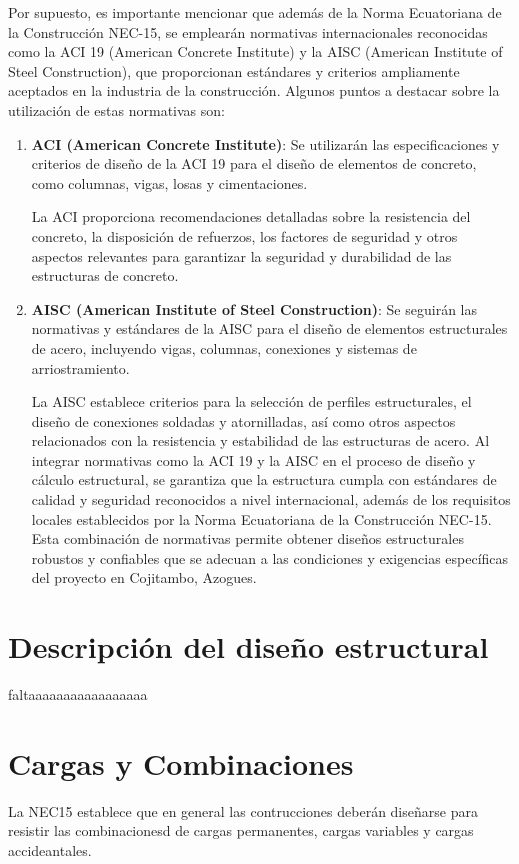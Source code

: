 \documentclass{article}
\begin{document}
Por supuesto, es importante mencionar que además de la Norma Ecuatoriana de la Construcción NEC-15, se emplearán normativas internacionales reconocidas como la ACI 19 (American Concrete Institute) y la AISC (American Institute of Steel Construction), que proporcionan estándares y criterios ampliamente aceptados en la industria de la construcción. Algunos puntos a destacar sobre la utilización de estas normativas son:
\begin{enumerate}
    \item  \textbf{ACI (American Concrete Institute)}: Se utilizarán las especificaciones y criterios de diseño de la ACI 19 para el diseño de elementos de concreto, como columnas, vigas, losas y cimentaciones. 
    
    La ACI  proporciona recomendaciones detalladas sobre la resistencia del concreto, la disposición de refuerzos, los factores de seguridad y otros aspectos relevantes para garantizar la seguridad y durabilidad de las estructuras de concreto.
    
    \item \textbf{AISC (American Institute of Steel Construction)}: Se seguirán las normativas y estándares de la AISC para el diseño de elementos estructurales de acero, incluyendo vigas, columnas, conexiones y sistemas de arriostramiento.
    
    La AISC establece criterios para la selección de perfiles estructurales, el diseño de conexiones soldadas y atornilladas, así como otros aspectos relacionados con la resistencia y estabilidad de las estructuras de acero.
    Al integrar normativas como la ACI 19 y la AISC en el proceso de diseño y cálculo estructural, se garantiza que la estructura cumpla con estándares de calidad y seguridad reconocidos a nivel internacional, además de los requisitos locales establecidos por la Norma Ecuatoriana de la Construcción NEC-15. Esta combinación de normativas permite obtener diseños estructurales robustos y confiables que se adecuan a las condiciones y exigencias específicas del proyecto en Cojitambo, Azogues.
\end{enumerate}

\section{Descripción del diseño estructural}
faltaaaaaaaaaaaaaaaaa

\section{Cargas y Combinaciones}
La NEC15 establece que en general las contrucciones deberán diseñarse para resistir las 
combinacionesd de cargas permanentes, cargas variables y cargas accideantales.
\end{document}
